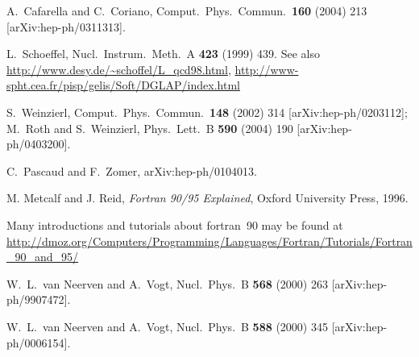 \documentclass[12pt]{article}
\begin{document}
\begin{thebibliography}{99}

 A.~Cafarella and C.~Coriano,
Comput.\ Phys.\ Commun.\  {\bf 160} (2004) 213
[arXiv:hep-ph/0311313].

L.~Schoeffel,
Nucl.\ Instrum.\ Meth.\ A {\bf 423} (1999) 439.
See also \url{http://www.desy.de/~schoffel/L_qcd98.html},
\url{http://www-spht.cea.fr/pisp/gelis/Soft/DGLAP/index.html}


S.~Weinzierl,
Comput.\ Phys.\ Commun.\  {\bf 148} (2002) 314
[arXiv:hep-ph/0203112];
M.~Roth and S.~Weinzierl,
Phys.\ Lett.\ B {\bf 590} (2004) 190
[arXiv:hep-ph/0403200].



C.~Pascaud and F.~Zomer,
arXiv:hep-ph/0104013.

  M. Metcalf and J. Reid, \emph{Fortran 90/95 Explained}, Oxford
  University Press, 1996.

 Many introductions and tutorials about
  fortran~90 may be found at
  \url{http://dmoz.org/Computers/Programming/Languages/Fortran/Tutorials/Fortran_90_and_95/}

  W.~L.~van Neerven and A.~Vogt,
  Nucl.\ Phys.\ B {\bf 568} (2000) 263
  [arXiv:hep-ph/9907472].

  W.~L.~van Neerven and A.~Vogt,
  Nucl.\ Phys.\ B {\bf 588} (2000) 345
  [arXiv:hep-ph/0006154].


\end{thebibliography}
\end{document}
